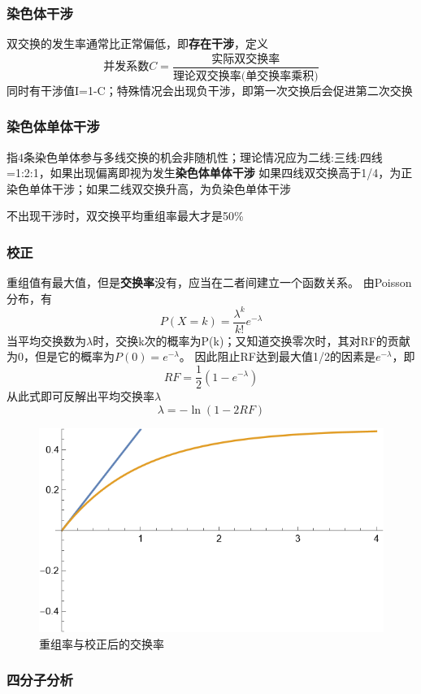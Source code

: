 \documentclass[a4paper, 12pt]{report}
\begin{document}
  \subsubsection{染色体干涉}
  双交换的发生率通常比正常偏低，即\textbf{存在干涉}，定义
  \[
    \text{并发系数}C=\dfrac{\text{实际双交换率}}{\text{理论双交换率(单交换率乘积)}}
  \]
  同时有干涉值I=1-C；特殊情况会出现负干涉，即第一次交换后会促进第二次交换
  \subsubsection{染色体单体干涉}
  指4条染色单体参与多线交换的机会非随机性；理论情况应为二线:三线:四线=1:2:1，如果出现偏离即视为发生\textbf{染色体单体干涉}
  如果四线双交换高于1/4，为正染色单体干涉；如果二线双交换升高，为负染色单体干涉

  不出现干涉时，双交换平均重组率最大才是50\%
  \subsubsection{校正}
  重组值有最大值，但是\textbf{交换率}没有，应当在二者间建立一个函数关系。
  由Poisson分布，有
  \[
    P(X=k)=\frac{\lambda^k}{k!}e^{-\lambda}
  \]
  当平均交换数为$\lambda$时，交换k次的概率为P(k)；又知道交换零次时，其对RF的贡献为0，但是它的概率为$P(0)=e^{-\lambda}$。
  因此阻止RF达到最大值1/2的因素是$e^{-\lambda}$，即
  \[
    RF=\frac{1}{2}(1-e^{-\lambda})
  \]
  从此式即可反解出平均交换率$\lambda$
  \[
    \lambda=-\ln(1-2RF)
  \]
  \begin{figure}[htbp]
    \centering
    \includegraphics{交换率校正.png}
    \caption{重组率与校正后的交换率}
    \label{交换&重组}
  \end{figure}
  \subsubsection{四分子分析}
\end{document}
